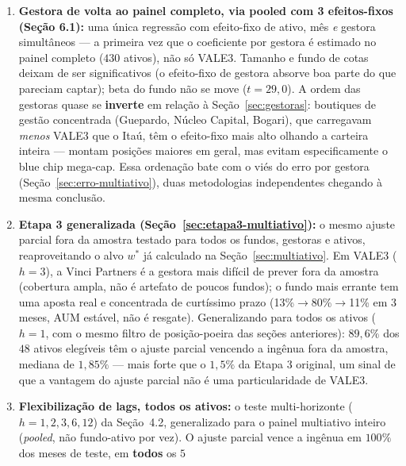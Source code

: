 \documentclass[11pt,a4paper]{article}
\begin{document}
\begin{enumerate}[topsep=2pt,itemsep=3pt]
obs.), $36$ das $41$ gestoras têm viés significativo (mas em geral pequeno) e a Guepardo tem o
viés mais positivo e, disparada, a maior dispersão (mais que o dobro da segunda colocada); viés e
dispersão andam juntos (correlação $0{,}88$) --- material que vai orientar o desenho do robô
caça-replicantes, decisão
ainda em aberto. Ainda restrito a VALE3 no ajuste parcial/in-out-of-sample desta rodada.
\item \textbf{Gestora de volta ao painel completo, via pooled com 3 efeitos-fixos (Seção 6.1):}
uma única regressão com efeito-fixo de ativo, mês \emph{e} gestora simultâneos --- a primeira vez que o
coeficiente por gestora é estimado no painel completo ($430$ ativos), não só VALE3. Tamanho e
fundo de cotas deixam de ser significativos (o efeito-fixo de gestora absorve boa parte do que
pareciam captar); beta do fundo não se move ($t=29{,}0$). A ordem das gestoras quase se
\textbf{inverte} em relação à Seção~\ref{sec:gestoras}: boutiques de gestão concentrada (Guepardo,
Núcleo Capital, Bogari), que carregavam \emph{menos} VALE3 que o Itaú, têm o efeito-fixo mais alto
olhando a carteira inteira --- montam posições maiores em geral, mas evitam especificamente o
blue chip mega-cap. Essa ordenação bate com o viés do erro por gestora (Seção~\ref{sec:erro-multiativo}),
duas metodologias independentes chegando à mesma conclusão.
\item \textbf{Etapa 3 generalizada (Seção~\ref{sec:etapa3-multiativo}):} o mesmo ajuste parcial
fora da amostra testado para todos os fundos, gestoras e ativos, reaproveitando o alvo $w^*$ já
calculado na Seção~\ref{sec:multiativo}. Em VALE3 ($h=3$), a Vinci Partners é a gestora mais
difícil de prever fora da amostra (cobertura ampla, não é artefato de poucos fundos); o fundo mais
errante tem uma aposta real e concentrada de curtíssimo prazo (13\%$\to$80\%$\to$11\% em 3 meses,
AUM estável, não é resgate). Generalizando para todos os ativos ($h=1$, com o mesmo filtro de
posição-poeira das seções anteriores): $89{,}6\%$ dos $48$ ativos elegíveis têm o ajuste parcial
vencendo a ingênua fora da amostra, mediana de $1{,}85\%$ --- mais forte que o $1{,}5\%$ da Etapa
3 original, um sinal de que a vantagem do ajuste parcial não é uma particularidade de VALE3.
\item \textbf{Flexibilização de lags, todos os ativos:} o teste multi-horizonte ($h=1,2,3,6,12$)
da Seção~4.2, generalizado para o painel multiativo inteiro (\emph{pooled}, não fundo-ativo por
vez). O ajuste parcial vence a ingênua em $100\%$ dos meses de teste, em \textbf{todos} os $5$

\end{enumerate}
\end{document}
